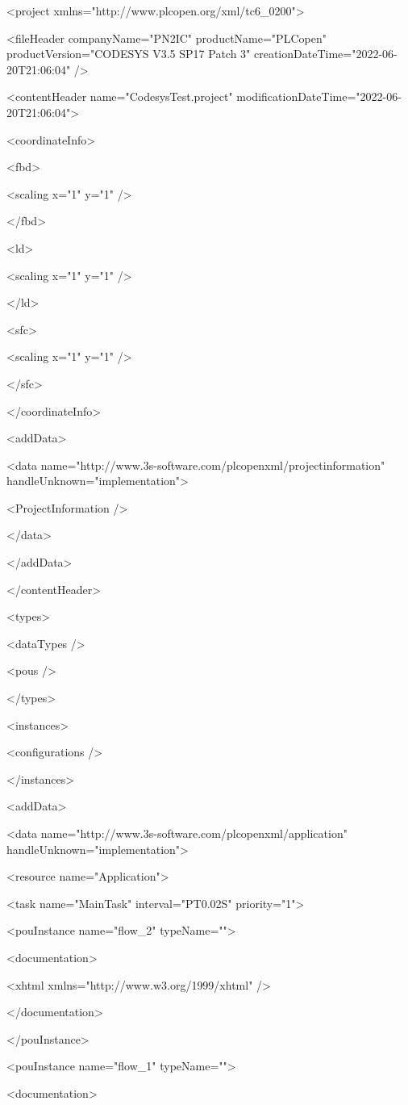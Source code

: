 <project xmlns="http://www.plcopen.org/xml/tc6\_0200">

<fileHeader companyName="PN2IC" productName="PLCopen" productVersion="CODESYS V3.5 SP17 Patch 3" creationDateTime="2022-06-20T21:06:04" />

<contentHeader name="CodesysTest.project" modificationDateTime="2022-06-20T21:06:04">

<coordinateInfo>

<fbd>

<scaling x="1" y="1" />

</fbd>

<ld>

<scaling x="1" y="1" />

</ld>

<sfc>

<scaling x="1" y="1" />

</sfc>

</coordinateInfo>

<addData>

<data name="http://www.3s-software.com/plcopenxml/projectinformation" handleUnknown="implementation">

<ProjectInformation />

</data>

</addData>

</contentHeader>

<types>

<dataTypes />

<pous />

</types>

<instances>

<configurations />

</instances>

<addData>

<data name="http://www.3s-software.com/plcopenxml/application" handleUnknown="implementation">

<resource name="Application">

<task name="MainTask" interval="PT0.02S" priority="1">

<pouInstance name="flow\_2" typeName="">

<documentation>

<xhtml xmlns="http://www.w3.org/1999/xhtml" />

</documentation>

</pouInstance>

<pouInstance name="flow\_1" typeName="">

<documentation>

